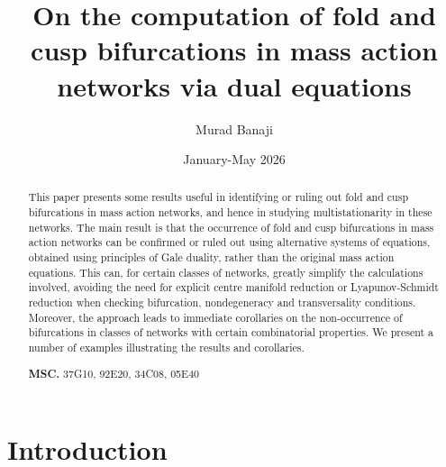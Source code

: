 \documentclass[11pt]{amsart}
\title[On fold and cusp bifurcations in mass action networks]{On the computation of fold and cusp bifurcations in mass action networks via dual equations}
\author{Murad Banaji}
\date{January-May 2026}
\theoremstyle{definition}
\begin{document}
\begin{abstract}
This paper presents some results useful in identifying or ruling out fold and cusp bifurcations in mass action networks, and hence in studying multistationarity in these networks. The main result is that the occurrence of fold and cusp bifurcations in mass action networks can be confirmed or ruled out using alternative systems of equations, obtained using principles of Gale duality, rather than the original mass action equations. This can, for certain classes of networks, greatly simplify the calculations involved, avoiding the need for explicit centre manifold reduction or Lyapunov-Schmidt reduction when checking bifurcation, nondegeneracy and transversality conditions. Moreover, the approach leads to immediate corollaries on the non-occurrence of bifurcations in classes of networks with certain combinatorial properties. We present a number of examples illustrating the results and corollaries.

\vspace{0.5cm}
\noindent
{\bf MSC.} 37G10, 92E20, 34C08, 05E40
\end{abstract}

\maketitle

\section{Introduction}
\end{document}
